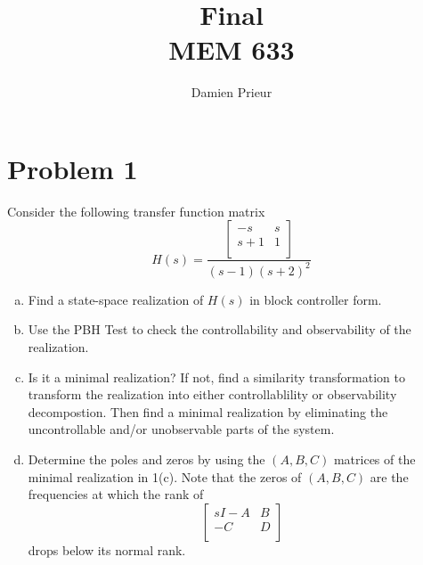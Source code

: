 \documentclass{article}
\author{Damien Prieur}
\title{Final \\ MEM 633}
\date{}
\begin{document}
\maketitle

\section*{Problem 1}
Consider the following transfer function matrix
$$
H(s) = \frac{
    \begin{bmatrix}
        -s & s \\
        s+1 & 1 \\
    \end{bmatrix}
}{(s-1)(s+2)^2}
$$
\begin{enumerate}[(a)]
\item Find a state-space realization of $H(s)$ in block controller form.
\newline

\item Use the PBH Test to check the controllability and observability of the realization.
\newline

\item Is it a minimal realization?
If not, find a similarity transformation to transform the realization into either controllablility or observability decompostion.
Then find a minimal realization by eliminating the uncontrollable and/or unobservable parts of the system.
\newline

\item Determine the poles and zeros by using the $(A,B,C)$ matrices of the minimal realization in 1(c).
\newline
Note that the zeros of $(A,B,C)$ are the frequencies at which the rank of
$$
\begin{bmatrix}
sI-A & B \\
-C & D \\
\end{bmatrix}
$$
drops below its normal rank.
\newline

\end{enumerate}

\newpage
\end{document}
